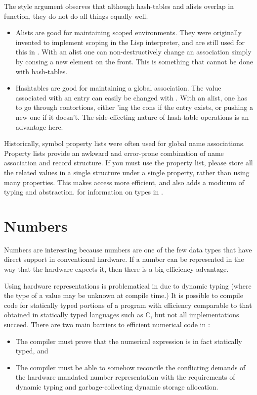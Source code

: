 The style argument observes that although hash-tables and alists
overlap in function, they do not do all things equally well.
\begin{itemize}
  
\item Alists are good for maintaining scoped environments.  They were
  originally invented to implement scoping in the Lisp interpreter,
  and are still used for this in \python.  With an alist one can
  non-destructively change an association simply by consing a new
  element on the front.  This is something that cannot be done with
  hash-tables.
  
\item Hashtables are good for maintaining a global association.  The
  value associated with an entry can easily be changed with
  .  With an alist, one has to go through contortions,
  either 'ing the cons if the entry exists, or pushing a
  new one if it doesn't.  The side-effecting nature of hash-table
  operations is an advantage here.
\end{itemize}


Historically, symbol property lists were often used for global name
associations.  Property lists provide an awkward and error-prone
combination of name association and record structure.  If you must use
the property list, please store all the related values in a single
structure under a single property, rather than using many properties.
This makes access more efficient, and also adds a modicum of typing
and abstraction.   for information on types
in \cmucl.


\section{Numbers}
\label{numeric-types}

Numbers are interesting because numbers are one of the few \llisp{} data types
that have direct support in conventional hardware.  If a number can be
represented in the way that the hardware expects it, then there is a big
efficiency advantage.

Using hardware representations is problematical in \llisp{} due to
dynamic typing (where the type of a value may be unknown at compile
time.)  It is possible to compile code for statically typed portions
of a \llisp{} program with efficiency comparable to that obtained in
statically typed languages such as C, but not all \llisp{}
implementations succeed.  There are two main barriers to efficient
numerical code in \llisp{}:
\begin{itemize}
  
\item The compiler must prove that the numerical expression is in fact
  statically typed, and
  
\item The compiler must be able to somehow reconcile the conflicting
  demands of the hardware mandated number representation with the
  \llisp{} requirements of dynamic typing and garbage-collecting
  dynamic storage allocation.
\end{itemize}

